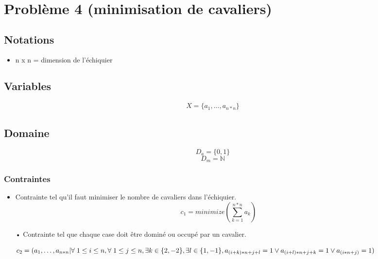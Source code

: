 \documentclass[a4paper,11pt]{article}
\begin{document}
\section{Problème 4 (minimisation de cavaliers)}
\subsection{Notations}
\begin{itemize}
\item n x n = dimension de l'échiquier
\end{itemize}

\subsection{Variables}
\begin{equation}
  \begin{split}
    X = \{a_1, \dots, a_{n*n} \}
  \end{split}
\end{equation}

\subsection{Domaine}
$$D_a = \{ 0, 1 \}$$
$$D_m = \mathbb{N}$$

\subsubsection{Contraintes}
\begin{itemize}
\item Contrainte tel qu'il faut minimiser le nombre de cavaliers dans l'échiquier.
  $$ c_1 = minimize(\sum_{k=1}^{n*n} a_k) $$
  
\item[•] Contrainte tel que chaque case doit être dominé ou occupé par un cavalier.
  
  $ c_2 = (a_1, \dots, a_{n*n} | \forall \hspace{0.1 cm}1 \leq i \leq n,  \forall  \hspace{0.1 cm}1 \leq j \leq n, \exists k \in \{2,-2\}, \exists l \in \{1,-1\}, \\
   a_{(i+k)*n +j +l}=1 \vee a_{(i+l)*n +j +k}=1 \vee a_{(i*n +j)} = 1) $ 
\end{itemize}
\end{document}
